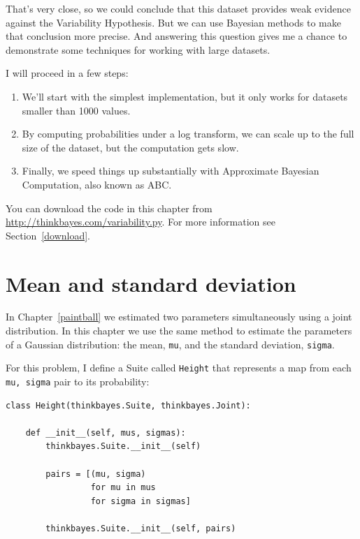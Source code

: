 \documentclass[12pt]{book}
\begin{document}
That's very close, so we could conclude that this dataset provides
weak evidence against the Variability Hypothesis.  But we can use
Bayesian methods to make that conclusion more precise.  And answering
this question gives me a chance to demonstrate some techniques
for working with large datasets.

I will proceed in a few steps:

\begin{enumerate}

\item We'll start with the simplest implementation, but it only works
  for datasets smaller than 1000 values.

\item By computing probabilities under a log transform, we can scale
  up to the full size of the dataset, but the computation gets slow.

\item Finally, we speed things up substantially with Approximate
  Bayesian Computation, also known as ABC.

\end{enumerate}

You can download the code in this chapter from
\url{http://thinkbayes.com/variability.py}.
  For more information
see Section~\ref{download}.

\section{Mean and standard deviation}

In Chapter~\ref{paintball} we estimated two parameters simultaneously
using a joint distribution.  In this chapter we use the same
method to estimate the parameters of a Gaussian distribution:
the mean, {\tt mu}, and the standard deviation, {\tt sigma}.

For this problem, I define a Suite called {\tt Height} that
represents a map from each {\tt mu, sigma} pair to its probability:

\begin{verbatim}
class Height(thinkbayes.Suite, thinkbayes.Joint):

    def __init__(self, mus, sigmas):
        thinkbayes.Suite.__init__(self)

        pairs = [(mu, sigma) 
                 for mu in mus
                 for sigma in sigmas]

        thinkbayes.Suite.__init__(self, pairs)
\end{verbatim}
\end{document}
